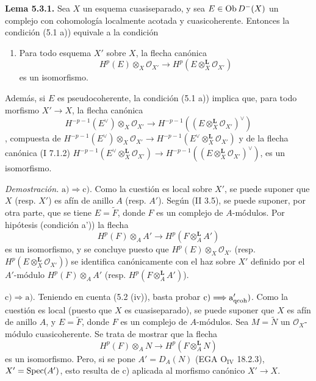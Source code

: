 \textbf{Lema 5.3.1.} Sea \(X\) un esquema cuasiseparado, y sea \(E\in\operatorname{Ob} D^{-}(X)\) un complejo con cohomología localmente acotada y cuasicoherente. Entonces la condición (5.1 a)) equivale a la condición
\begin{enumerate}[label=\alph*)]
\item[c)] Para todo esquema \(X'\) sobre \(X\), la flecha canónica
\[
 H^p(E)\otimes_X\mathcal O_{X'}\longrightarrow H^p(E\otimes_X^{\mathbf L}\mathcal O_{X'})
\]
es un isomorfismo.
\end{enumerate}
Además, si \(E\) es pseudocoherente, la condición (5.1 a)) implica que, para todo morfismo \(X'\to X\), la flecha canónica
\begin{equation}
 H^{-p-1}(E^{\vee})\otimes_X\mathcal O_{X'}\longrightarrow H^{-p-1}((E\otimes_X^{\mathbf L}\mathcal O_{X'})^{\vee})\tag{5.3.1.1}
\end{equation}
, compuesta de \(H^{-p-1}(E^{\vee})\otimes_X\mathcal O_{X'}\longrightarrow H^{-p-1}(E^{\vee}\otimes_X^{\mathbf L}\mathcal O_{X'})\) y de la flecha canónica (I 7.1.2) \(H^{-p-1}(E^{\vee}\otimes_X^{\mathbf L}\mathcal O_{X'})\longrightarrow H^{-p-1}((E\otimes_X^{\mathbf L}\mathcal O_{X'})^{\vee})\), es un isomorfismo.

\emph{Demostración.} \(\mathrm a)\Longrightarrow\mathrm c)\). Como la cuestión es local sobre \(X'\), se puede suponer que \(X\) (resp. \(X'\)) es afín de anillo \(A\) (resp. \(A'\)). Según (II 3.5), se puede suponer, por otra parte, que se tiene \(E=\widetilde F\), donde \(F\) es un complejo de \(A\)-módulos. Por hipótesis (condición a')) la flecha
\[
 H^p(F)\otimes_A A'\longrightarrow H^p(F\otimes_A^{\mathbf L}A')
\]
es un isomorfismo, y se concluye puesto que \(H^p(E)\otimes_X\mathcal O_{X'}\) (resp. \(H^p(E\otimes_X^{\mathbf L}\mathcal O_{X'})\)) se identifica canónicamente con el haz sobre \(X'\) definido por el \(A'\)-módulo \(H^p(F)\otimes_A A'\) (resp. \(H^p(F\otimes_A^{\mathbf L}A')\)).

\(\mathrm c)\Longrightarrow\mathrm a)\). Teniendo en cuenta (5.2 (iv)), basta probar \(\mathrm c)\Longrightarrow\mathrm a'_{\mathrm{qcoh}})\). Como la cuestión es local (puesto que \(X\) es cuasiseparado), se puede suponer que \(X\) es afín de anillo \(A\), y \(E=\widetilde F\), donde \(F\) es un complejo de \(A\)-módulos. Sea \(M=\widetilde N\) un \(\mathcal O_X\)-módulo cuasicoherente. Se trata de mostrar que la flecha
\[
 H^p(F)\otimes_A N\longrightarrow H^p(F\otimes_A^{\mathbf L}N)
\]
es un isomorfismo. Pero, si se pone \(A'=D_A(N)\) (EGA \(\mathrm O_{\mathrm{IV}}\) 18.2.3), \(X'=\operatorname{Spec}(A')\), esto resulta de c) aplicada al morfismo canónico \(X'\to X\).

